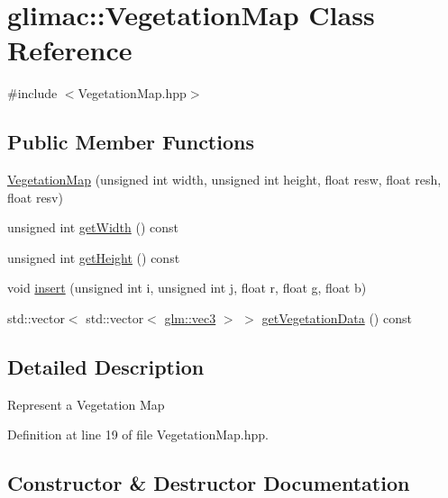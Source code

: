 \hypertarget{classglimac_1_1_vegetation_map}{}\section{glimac\+:\+:Vegetation\+Map Class Reference}
\label{classglimac_1_1_vegetation_map}


{\ttfamily \#include $<$Vegetation\+Map.\+hpp$>$}

\subsection*{Public Member Functions}
\begin{DoxyCompactItemize}
\item 
\hyperlink{classglimac_1_1_vegetation_map_a49f60532f0d24614587c698a04871e7e}{Vegetation\+Map} (unsigned int width, unsigned int height, float resw, float resh, float resv)
\item 
unsigned int \hyperlink{classglimac_1_1_vegetation_map_a129e6a0197f0ff9fb0d5d7f8ed6a9b78}{get\+Width} () const
\item 
unsigned int \hyperlink{classglimac_1_1_vegetation_map_a01260f4f36662b96c754902cd3e2e203}{get\+Height} () const
\item 
void \hyperlink{classglimac_1_1_vegetation_map_a95dd8bddf998e034565d5353dee84a75}{insert} (unsigned int i, unsigned int j, float r, float g, float b)
\item 
std\+::vector$<$ std\+::vector$<$ \hyperlink{group__core__types_ga1c47e8b3386109bc992b6c48e91b0be7}{glm\+::vec3} $>$ $>$ \hyperlink{classglimac_1_1_vegetation_map_ac8629079c4237ecccb141c871f1be874}{get\+Vegetation\+Data} () const
\end{DoxyCompactItemize}


\subsection{Detailed Description}
Represent a Vegetation Map 

Definition at line 19 of file Vegetation\+Map.\+hpp.



\subsection{Constructor \& Destructor Documentation}
\mbox{\label{classglimac_1_1_vegetation_map_a49f60532f0d24614587c698a04871e7e}} 
